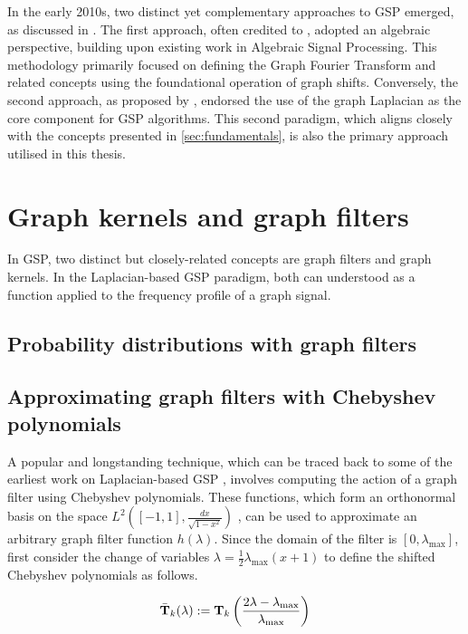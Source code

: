 In the early 2010s, two distinct yet complementary approaches to GSP emerged, as discussed in \cite{Leus2023}. The first approach, often credited to \cite{Sandryhaila2013,Sandryhaila2013b}, adopted an algebraic perspective, building upon existing work in Algebraic Signal Processing. This methodology primarily focused on defining the Graph Fourier Transform and related concepts using the foundational operation of graph shifts. Conversely, the second approach, as proposed by  \cite{Hammond2011,Shuman2013}, endorsed the use of the graph Laplacian as the core component for GSP algorithms. This second paradigm, which aligns closely with the concepts presented in \cref{sec:fundamentals}, is also the primary approach utilised in this thesis.


\section{Graph kernels and graph filters}

\label{sec:graph_kernels}

In GSP, two distinct but closely-related concepts are graph filters and graph kernels. In the Laplacian-based GSP paradigm, both can understood as a function applied to the frequency profile of a graph signal. 


\subsection{Probability distributions with graph filters}

\subsection{Approximating graph filters with Chebyshev polynomials}

A popular and longstanding technique, which can be traced back to some of the earliest work on Laplacian-based GSP \citep{Hammond2011}, involves computing the action of a graph filter using Chebyshev polynomials. These functions, which form an orthonormal basis on the space $L^2 \left([-1, 1], \frac{dx}{\sqrt{1 - x^2}}\right)$ \citep{Mason2002}, can be used to approximate an arbitrary graph filter function $h(\lambda)$. Since the domain of the filter is $[0, \lambda_{\text{max}}]$, first consider the change of variables $\lambda = \frac{1}{2}\lambda_{\text{max}}(x + 1)$ to define the shifted Chebyshev polynomials as follows. 

\begin{equation}
    \bar{\mathbf{T}}_k(\lambda) := \mathbf{T}_{k}\left(\frac{2\lambda - \lambda_{\text{max}}}{\lambda_{\text{max}}}\right)
\end{equation}

